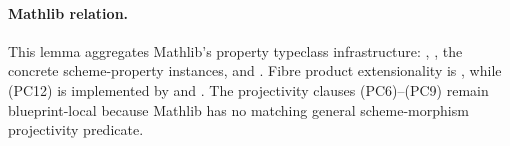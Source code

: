 \begin{lemma}
  \paragraph{Mathlib relation.}
  This lemma aggregates Mathlib's property typeclass infrastructure:
  \texttt{},
  \texttt{},
  the concrete scheme-property instances, and
  \texttt{}.  Fibre
  product extensionality is \texttt{}, while
  (PC12) is implemented by
  \texttt{} and
  \texttt{}.  The projectivity clauses
  (PC6)--(PC9) remain blueprint-local because Mathlib has no matching general
  scheme-morphism projectivity predicate.
\end{lemma}

